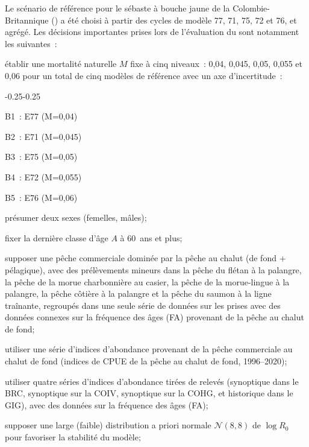 \documentclass[11pt]{book}
\begin{document}
Le sc\'{e}nario de r\'{e}f\'{e}rence pour le s\'{e}baste \`{a} bouche jaune de la Colombie-Britannique (\BCa{}) a \'{e}t\'{e} choisi \`{a} partir des cycles de mod\`{e}le 77, 71, 75, 72 et 76, et agr\'{e}g\'{e}.
Les d\'{e}cisions importantes prises lors de l'\'{e}valuation du \BCa{} sont notamment les suivantes~:
\begin{itemize_csas}{}{}
  \item \'{e}tablir une mortalit\'{e} naturelle $M$ fixe \`{a} cinq niveaux~: 0,04, 0,045, 0,05, 0,055 et 0,06 pour un total de cinq mod\`{e}les de r\'{e}f\'{e}rence avec un axe d'incertitude~:
  \begin{itemize_csas}{-0.25}{-0.25}
    \item B1~: E77 (M=0,04)
    \item B2~: E71 (M=0,045)
    \item B3~: E75 (M=0,05)
    \item B4~: E72 (M=0,055)
    \item B5~: E76 (M=0,06)
  \end{itemize_csas}
  \item pr\'{e}sumer deux sexes (femelles, m\^{a}les);
  \item fixer la derni\`{e}re classe d'\^{a}ge $A$ \`{a} 60~ans et plus;
  \item supposer une p\^{e}che commerciale domin\'{e}e par la p\^{e}che au chalut (de fond + p\'{e}lagique), avec des pr\'{e}l\`{e}vements mineurs dans la p\^{e}che du fl\'{e}tan \`{a} la palangre, la p\^{e}che de la morue charbonni\`{e}re au casier, la p\^{e}che de la morue-lingue \`{a} la palangre, la p\^{e}che c\^{o}ti\`{e}re \`{a} la palangre et la p\^{e}che du saumon \`{a} la ligne tra\^{i}nante, regroup\'{e}s dans une seule s\'{e}rie de donn\'{e}es sur les prises avec des donn\'{e}es connexes sur la fr\'{e}quence des \^{a}ges (FA) provenant de la p\^{e}che au chalut de fond;
  \item utiliser une s\'{e}rie d'indices d'abondance provenant de la p\^{e}che commerciale au chalut de fond (indices de CPUE de la p\^{e}che au chalut de fond, 1996--2020);
  \item utiliser quatre s\'{e}ries d'indices d'abondance tir\'{e}es de relev\'{e}s (synoptique dans le BRC, synoptique sur la COIV, synoptique sur la COHG, et historique dans le GIG), avec des donn\'{e}es sur la fr\'{e}quence des \^{a}ges (FA);
  \item supposer une large (faible) distribution a priori normale $\mathcal{N}(8,8)$ de $\log R_0$ pour favoriser la stabilit\'{e} du mod\`{e}le; 

\end{itemize_csas}
\end{document}
